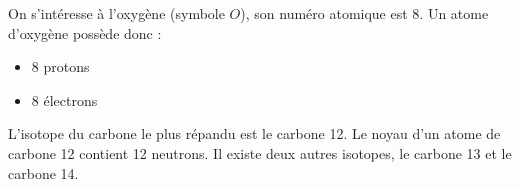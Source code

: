 \begin{myex}
	On s'intéresse à l'oxygène (symbole $O$), son numéro atomique est 8. Un atome d'oxygène possède donc :
	\begin{itemize}
		\item 8 protons
		\item 8 électrons
	\end{itemize}

	L'isotope du carbone le plus répandu est le carbone 12. Le noyau d'un atome de carbone 12 contient 12 neutrons. Il existe deux autres isotopes, le carbone 13 et le carbone 14.
\end{myex}